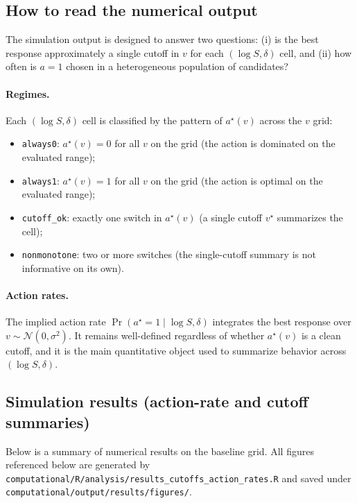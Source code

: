 \subsection{How to read the numerical output}\label{subsec:sim_interpret}

The simulation output is designed to answer two questions: (i) is the best response approximately a single cutoff in
$v$ for each $(\log S,\delta)$ cell, and (ii) how often is $a=1$ chosen in a heterogeneous population of candidates?

\paragraph{Regimes.}
Each $(\log S,\delta)$ cell is classified by the pattern of $a^\star(v)$ across the $v$ grid:
\begin{itemize}
    \item \texttt{always0}: $a^\star(v)=0$ for all $v$ on the grid (the action is dominated on the evaluated range);
    \item \texttt{always1}: $a^\star(v)=1$ for all $v$ on the grid (the action is optimal on the evaluated range);
    \item \texttt{cutoff\_ok}: exactly one switch in $a^\star(v)$ (a single cutoff $v^\star$ summarizes the cell);
    \item \texttt{nonmonotone}: two or more switches (the single-cutoff summary is not informative on its own).
\end{itemize}

\paragraph{Action rates.}
The implied action rate $\Pr(a^\star=1\mid \log S,\delta)$ integrates the best response over
$v\sim\mathcal{N}(0,\sigma^2)$. It remains well-defined regardless of whether $a^\star(v)$ is a clean cutoff, and it
is the main quantitative object used to summarize behavior across $(\log S,\delta)$.

\subsection{Simulation results (action-rate and cutoff summaries)}\label{subsec:sim_results}

Below is a summary of numerical results on the baseline grid. All figures referenced below are generated by
\texttt{computational/R/analysis/results\_cutoffs\_action\_rates.R} and saved under
\texttt{computational/output/results/figures/}.

